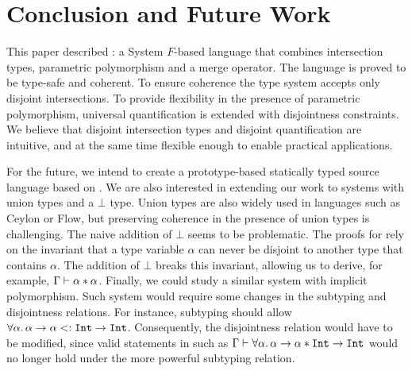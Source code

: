 \section{Conclusion and Future Work}
\label{sec:conclusion}

This paper described \name: a System $F$-based language that combines
intersection types, parametric polymorphism and a merge operator.
The language is proved to be type-safe and coherent.
To ensure coherence the type system accepts only
disjoint intersections. To provide flexibility in the presence of parametric polymorphism,
universal quantification is extended with
disjointness constraints. We believe that disjoint intersection types
and disjoint quantification are intuitive, and at the same time
flexible enough to enable practical applications.


For the future, we intend to create a prototype-based statically typed
source language based on \name.  We are also interested in extending
our work to systems with union types and a $\bot$ type. Union types
are also widely used in languages such as Ceylon or Flow, but
preserving coherence in the presence of union types is
challenging. The naive addition of $\bot$ seems to be problematic. 
The proofs for \name rely on the invariant that a type variable $\alpha$ can never be disjoint 
to another type that contains $\alpha$. The addition of $\bot$ breaks
this invariant, allowing us to derive, for example, $\Gamma \vdash \alpha * \alpha$.
Finally, we could study a similar system with implicit polymorphism.
Such system would require some changes in the subtyping and disjointness relations.
For instance, subtyping should allow  
${\forall \alpha.\, \alpha \to \alpha} <: \texttt{Int} \to \texttt{Int}$.
Consequently, the disjointness relation would have to be modified,
since valid statements in \name such as 
$\Gamma \vdash \forall \alpha.\, \alpha \to \alpha * \texttt{Int} \to \texttt{Int}$ 
would no longer hold under the more powerful subtyping relation. 
